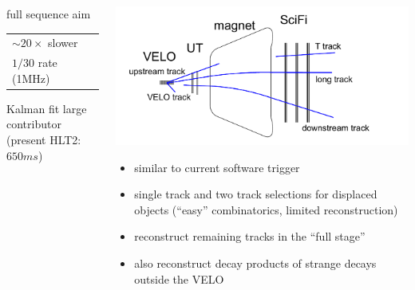 \documentclass[table,xcolor=dvipsnames,professionalfonts]{beamer}
\begin{document}
\begin{frame}
\begin{columns}
\begin{column}{.5\textwidth}
{%

      full sequence aim
      {\small{\begin{tabular}{l}
        $\sim 20\times$ slower\\ $1/30$ rate (\unit{1}{MHz})\end{tabular}}}
      \newline Kalman fit large contributor
      \newline (present HLT2: $\unit{650}{ms}$)
    }
    
  \end{column}
  \begin{column}{.5\textwidth}
    \includegraphics[width=.8\textwidth]{./ttypes.pdf}
    \begin{itemize}
        \item similar to current software trigger
          \item single track and two track selections for displaced objects
            \newline (``easy'' combinatorics, limited reconstruction)
            \item<2-> reconstruct remaining tracks in the ``full stage''
              \item<2-> also reconstruct decay products of strange decays outside the VELO
    \end{itemize}
  \end{column}
  \end{columns}
\end{frame}
\end{document}
